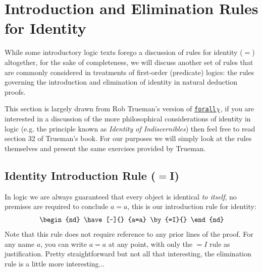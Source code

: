 \section{Introduction and Elimination Rules for Identity}
While some introductory logic texts forego a discussion of rules for identity ($=$) altogether, for the sake of completeness, we will discuss another set of rules that are commonly considered in treatments of first-order (predicate) logics: the rules governing the introduction and elimination of identity in natural deduction proofs.

This section is largely drawn from Rob Trueman's version of \href{https://www.rtrueman.com/forallx.html}{\texttt{forall}$\chi$}, if you are interested in a discussion of the more philosophical considerations of identity in logic (e.g. the principle known as \textit{Identity of Indiscernibles}) then feel free to read section 32 of Trueman's book. For our purposes we will simply look at the rules themselves and present the same exercises provided by Trueman.
\subsection{Identity Introduction Rule ($=$I)}
In logic we are always guaranteed that every object is identical \textit{to itself}, no premises are required to conclude $a=a$, this is our introduction rule for identity:
\begin{equation}
    \begin{nd}
        \have[~]{} {a=a} \by{=I}{}
    \end{nd} \nonumber
\end{equation}
Note that this rule does not require reference to any prior lines of the proof. For any name $a$, you can write $a = a$ at any point, with only the $=I$ rule as justification. Pretty straightforward but not all that interesting, the elimination rule is a little more interesting...

